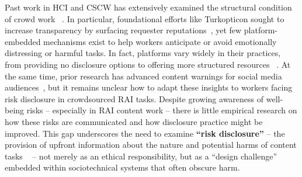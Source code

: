 Past work in HCI and CSCW has extensively examined the structural condition of crowd work ~\cite{gray2016crowd, silberman2018responsible,salehi2015we}. In particular, foundational efforts like Turkopticon sought to increase transparency by surfacing requester reputations~\cite{irani2013turkopticon}, yet few platform-embedded mechanisms exist to help workers anticipate or avoid emotionally distressing or harmful tasks. In fact, platforms vary widely in their practices, from providing no disclosure options to offering more structured resources ~\cite{prolific2025participant, prolific2025sensitive, ProlificAPIContentWarning2025}. At the same time, prior research has advanced content warnings for social media audiences~\cite{Zhang2024PerceptionsTriggerWarnings, shashirekha2023trigger, bell2025warning}, but it remains unclear how to adapt these insights to workers facing risk disclosure in crowdsourced RAI tasks. Despite growing awareness of well-being risks -- especially in RAI content work -- there is little empirical research on how these risks are communicated and how disclosure practice might be improved. This gap underscores the need to examine \textbf{``risk disclosure''} -- the provision of upfront information about the
nature and potential harms of content tasks ~\cite{bharucha2023content, qian2025aura} -- not merely as an ethical responsibility, but as a ``design challenge'' embedded within sociotechnical systems that often obscure harm.


